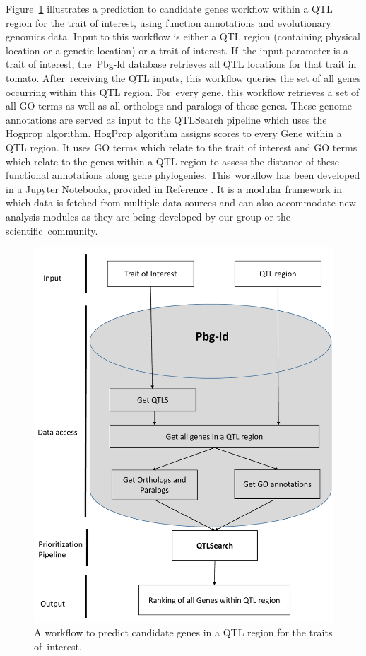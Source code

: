 \documentclass[applsci,article,accept,moreauthors,pdftex]{Definitions/mdpi}
\begin{document}
{Figure~\ref{Figure7} illustrates a prediction to candidate genes workflow within a QTL region for the trait of interest, using function annotations and evolutionary genomics data. Input to this workflow is either a QTL region (containing physical location or a genetic location) or a trait of interest. If~the input parameter is a trait of interest, the~Pbg-ld database retrieves all QTL locations for that trait in tomato. After~receiving the QTL inputs, this workflow queries the set of all genes occurring within this QTL region. For~every gene, this workflow retrieves a set of all GO terms as well as all orthologs and paralogs of these genes. These genome annotations are served as input to the QTLSearch pipeline which uses the Hogprop algorithm. HogProp algorithm assigns scores to every Gene within a QTL region. It uses GO terms which relate to the trait of interest and GO terms which relate to the genes within a QTL region to assess the distance of these functional annotations along gene phylogenies. This~workflow has been developed in a Jupyter Notebooks, provided in Reference \cite{Noteboook:example2}. It is a modular framework in which data is fetched from multiple data sources and can also accommodate new analysis modules as they are being developed by our group or the scientific~community.
\begin{figure}[H]
\centering
\includegraphics[scale=0.60]{Figure7.pdf}
\caption{A workflow to predict candidate genes in a QTL region for the traits of~interest.} \label{Figure7}
\end{figure}

}
\end{document}
